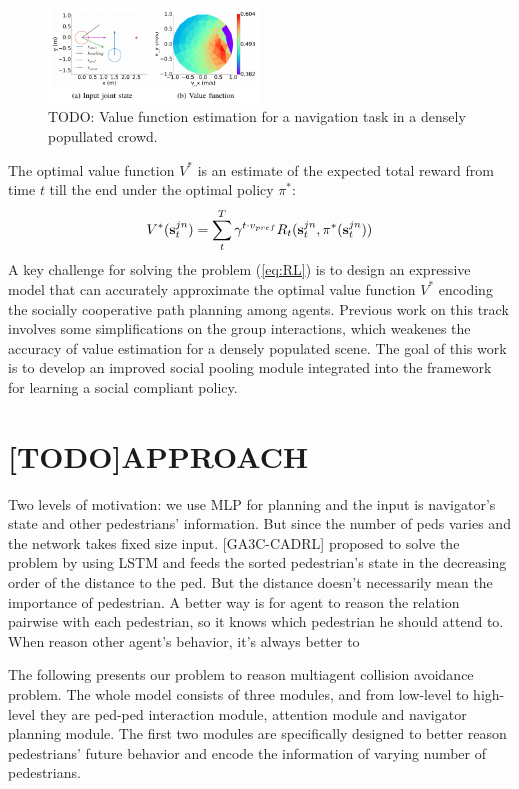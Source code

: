 \documentclass[letterpaper, 10 pt, conference]{ieeeconf}  %
\begin{document}
\begin{figure} [t]
  \captionsetup{font=small}
  \includegraphics[width=0.5\textwidth]{figures/vf} 
  \caption{TODO: Value function estimation for a navigation task in a densely popullated crowd.}
  \label{fig:overview}
\end{figure}

The optimal value function $V^*$ is an estimate of the expected total reward from time $t$ till the end under the optimal policy $\pi^*$: 
\begin{equation}
V^*(\bold{s}_t^{jn}) = \sum_{t}^T \gamma^{t \cdot v_{pref}} R_t(\bold{s}_t^{jn},\pi^*(\bold{s}_t^{jn}))
\end{equation}
A key challenge for solving the problem (\ref{eq:RL}) is to design an expressive model that can accurately approximate the optimal value function $V^{*}$ encoding the socially cooperative path planning among agents. Previous work on this track involves some simplifications on the group interactions, which weakenes the accuracy of value estimation for a densely populated scene. The goal of this work is to develop an improved social pooling module integrated into the framework for learning a social compliant policy. 

\section{[TODO]APPROACH} \label{sec:approach} 
Two levels of motivation: we use MLP for planning and the input is navigator's state and other pedestrians' information. But since the number of peds varies and the network takes fixed size input. [GA3C-CADRL] proposed to solve the problem by using LSTM and feeds the sorted pedestrian's state in the decreasing order of the distance to the ped. But the distance doesn't necessarily mean the importance of pedestrian. A better way is for agent to reason the relation pairwise with each pedestrian, so it knows which pedestrian he should attend to. When reason other agent's behavior, it's always better to  

The following presents our problem to reason multiagent collision avoidance problem. The whole model consists of three modules, and from low-level to high-level they are ped-ped interaction module, attention module and navigator planning module. The first two modules are specifically designed to better reason pedestrians' future behavior and encode the information of varying number of pedestrians.
\end{document}
